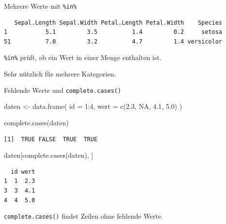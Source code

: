 \documentclass[
  10pt,
  ignorenonframetext,
  aspectratio=169,
]{beamer}
\newenvironment{Shaded}{}{}
\newcommand{\AttributeTok}[1]{\textcolor[rgb]{0.49,0.56,0.16}{#1}}
\newcommand{\ConstantTok}[1]{\textcolor[rgb]{0.53,0.00,0.00}{#1}}
\newcommand{\DecValTok}[1]{\textcolor[rgb]{0.25,0.63,0.44}{#1}}
\newcommand{\FloatTok}[1]{\textcolor[rgb]{0.25,0.63,0.44}{#1}}
\newcommand{\FunctionTok}[1]{\textcolor[rgb]{0.02,0.16,0.49}{#1}}
\newcommand{\NormalTok}[1]{#1}
\newcommand{\OtherTok}[1]{\textcolor[rgb]{0.00,0.44,0.13}{#1}}
\newcommand{\SpecialCharTok}[1]{\textcolor[rgb]{0.25,0.44,0.63}{#1}}
\newcommand{\StringTok}[1]{\textcolor[rgb]{0.25,0.44,0.63}{#1}}
\begin{document}
\begin{frame}[fragile]{Mehrere Werte mit \texttt{\%in\%}}
\label{mehrere-werte-mit-in}
\begin{Shaded}
\end{Shaded}

\begin{verbatim}
   Sepal.Length Sepal.Width Petal.Length Petal.Width    Species
1           5.1         3.5          1.4         0.2     setosa
51          7.0         3.2          4.7         1.4 versicolor
\end{verbatim}

\texttt{\%in\%} prüft, ob ein Wert in einer Menge enthalten ist.

Sehr nützlich für mehrere Kategorien.
\end{frame}

\begin{frame}[fragile]{Fehlende Werte und \texttt{complete.cases()}}
\label{fehlende-werte-und-complete.cases}
\begin{Shaded}
\begin{Highlighting}[]
\NormalTok{daten }\OtherTok{\textless{}{-}} \FunctionTok{data.frame}\NormalTok{(}
  \AttributeTok{id =} \DecValTok{1}\SpecialCharTok{:}\DecValTok{4}\NormalTok{,}
  \AttributeTok{wert =} \FunctionTok{c}\NormalTok{(}\FloatTok{2.3}\NormalTok{, }\ConstantTok{NA}\NormalTok{, }\FloatTok{4.1}\NormalTok{, }\FloatTok{5.0}\NormalTok{)}
\NormalTok{)}

\FunctionTok{complete.cases}\NormalTok{(daten)}
\end{Highlighting}
\end{Shaded}

\begin{verbatim}
[1]  TRUE FALSE  TRUE  TRUE
\end{verbatim}

\begin{Shaded}
\begin{Highlighting}[]
\NormalTok{daten[}\FunctionTok{complete.cases}\NormalTok{(daten), ]}
\end{Highlighting}
\end{Shaded}

\begin{verbatim}
  id wert
1  1  2.3
3  3  4.1
4  4  5.0
\end{verbatim}

\texttt{complete.cases()} findet Zeilen ohne fehlende Werte.
\end{frame}
\end{document}
